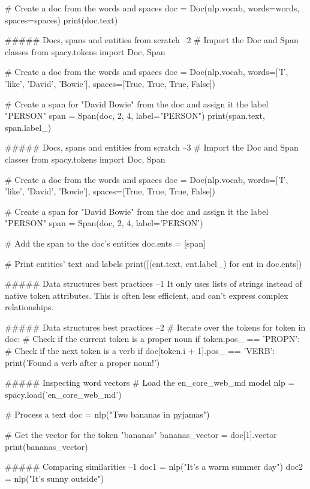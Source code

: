 # Create a doc from the words and spaces
doc = Doc(nlp.vocab, words=words, spaces=spaces)
print(doc.text)



##### Docs, spans and entities from scratch  --2
# Import the Doc and Span classes
from spacy.tokens import Doc, Span

# Create a doc from the words and spaces
doc = Doc(nlp.vocab, words=['I', 'like', 'David', 'Bowie'], spaces=[True, True, True, False])

# Create a span for "David Bowie" from the doc and assign it the label "PERSON"
span = Span(doc, 2, 4, label="PERSON")
print(span.text, span.label_)



##### Docs, spans and entities from scratch  --3
# Import the Doc and Span classes
from spacy.tokens import Doc, Span

# Create a doc from the words and spaces
doc = Doc(nlp.vocab, words=['I', 'like', 'David', 'Bowie'], spaces=[True, True, True, False])

# Create a span for "David Bowie" from the doc and assign it the label "PERSON"
span = Span(doc, 2, 4, label='PERSON')

# Add the span to the doc's entities
doc.ents = [span]

# Print entities' text and labels
print([(ent.text, ent.label_) for ent in doc.ents])



##### Data structures best practices  --1
It only uses lists of strings instead of native token attributes. This is often less efficient, and can't express complex relationships.

##### Data structures best practices  --2
# Iterate over the tokens
for token in doc:
    # Check if the current token is a proper noun
    if token.pos_ == 'PROPN':
        # Check if the next token is a verb
        if doc[token.i + 1].pos_ == 'VERB':
            print('Found a verb after a proper noun!')


##### Inspecting word vectors
# Load the en_core_web_md model
nlp = spacy.load('en_core_web_md')

# Process a text
doc = nlp("Two bananas in pyjamas")

# Get the vector for the token "bananas"
bananas_vector = doc[1].vector
print(bananas_vector)


##### Comparing similarities  --1
doc1 = nlp("It's a warm summer day")
doc2 = nlp("It's sunny outside")

